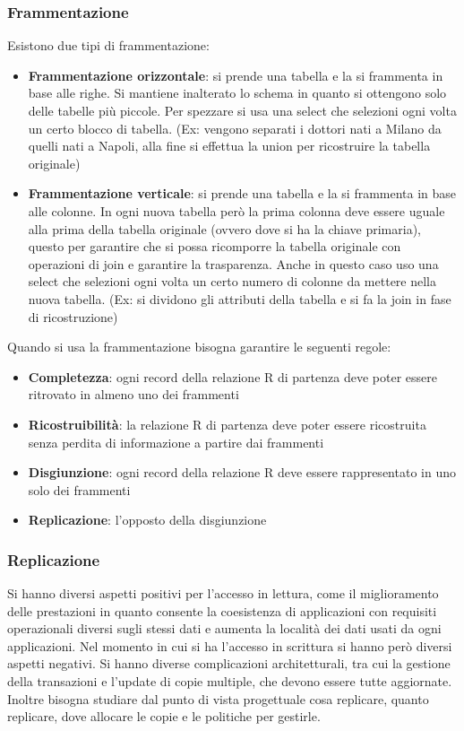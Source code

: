\subsubsection{Frammentazione}
Esistono due tipi di frammentazione:
\begin{itemize}
    \item \textbf{Frammentazione orizzontale}: si prende una tabella e la si
          frammenta in base alle righe. Si mantiene inalterato lo schema in
          quanto si ottengono solo delle tabelle più piccole. Per spezzare si
          usa una select che selezioni ogni volta un certo blocco di tabella.
          (Ex: vengono separati i dottori nati a Milano da quelli nati a Napoli, 
          alla fine si effettua la union per ricostruire la tabella originale)
    \item \textbf{Frammentazione verticale}: si prende una tabella e la si frammenta
          in base alle colonne. In ogni nuova tabella però la prima colonna
          deve essere uguale alla prima della tabella originale (ovvero dove si
          ha la chiave primaria), questo per garantire che si possa ricomporre
          la tabella originale con operazioni di join e garantire la
          trasparenza. Anche in questo caso uso una select che selezioni ogni
          volta un certo numero di colonne da mettere nella nuova tabella.
          (Ex: si dividono gli attributi della tabella e si fa la join in fase di 
          ricostruzione)
\end{itemize}
Quando si usa la frammentazione bisogna garantire le seguenti regole:
\begin{itemize}
    \item \textbf{Completezza}: ogni record della relazione R di partenza
          deve poter essere ritrovato in almeno uno dei frammenti
    \item \textbf{Ricostruibilità}: la relazione R di partenza deve poter essere
          ricostruita senza perdita di informazione a partire dai frammenti
    \item \textbf{Disgiunzione}: ogni record della relazione R deve essere
          rappresentato in uno solo dei frammenti
    \item \textbf{Replicazione}: l'opposto della disgiunzione
\end{itemize}
\subsubsection{Replicazione}
Si hanno diversi aspetti positivi per l'accesso in lettura, come il miglioramento
delle prestazioni in quanto consente la coesistenza di applicazioni con requisiti
operazionali diversi sugli stessi dati e aumenta la località dei dati usati da
ogni applicazioni. Nel momento in cui si ha l'accesso in scrittura si hanno però
diversi aspetti negativi. Si hanno diverse complicazioni architetturali, tra cui
la gestione della transazioni e l'update di copie multiple, che devono essere
tutte aggiornate. Inoltre bisogna studiare dal punto di vista progettuale cosa
replicare, quanto replicare, dove allocare le copie e le politiche per gestirle.

